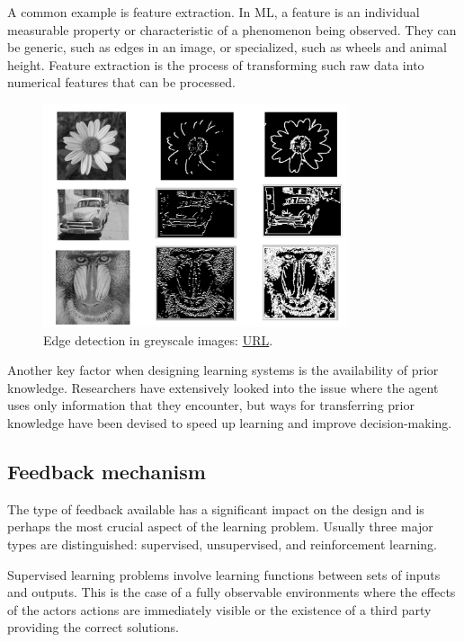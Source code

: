 A common example is feature extraction. In ML, a feature \cite{Elgendy2020_ml_feature} is an individual measurable property or characteristic of a phenomenon being observed. They can be generic, such as edges in an image, or specialized, such as wheels and animal height. Feature extraction is the process of transforming such raw data into numerical features that can be processed.
\begin{figure}[H]
    \centering
        \includegraphics[width=0.8\textwidth]{Images/edge_detection.png}
        \decoRule
        \caption[Edge detection in greyscale images]{Edge detection in greyscale images: \href{https://aryamansharda.medium.com/how-image-edge-detection-works-b759baac01e2}{URL}.}
        \label{fig:Edge detection in greyscale images}
\end{figure}

Another key factor when designing learning systems is the availability of prior knowledge. Researchers have extensively looked into the issue where the agent uses only information that they encounter, but ways for transferring prior knowledge have been devised to speed up learning and improve decision-making.\cite{Transfer_Learning}

\subsection{Feedback mechanism}
The type of feedback available has a significant impact on the design and is perhaps the most crucial aspect of the learning problem. Usually three major types are distinguished: supervised, unsupervised, and reinforcement learning.

Supervised learning problems involve learning functions between sets of inputs and outputs. This is the case of a fully observable environments where the effects of the actors actions are immediately visible or the existence of a third party providing the correct solutions.


